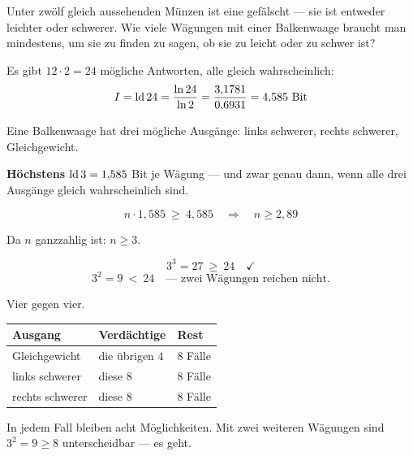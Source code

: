 \begin{aufgabe}
Unter zwölf gleich aussehenden Münzen ist eine gefälscht --- sie ist entweder leichter oder schwerer. Wie viele Wägungen mit einer Balkenwaage braucht man mindestens, um sie zu finden  zu sagen, ob sie zu leicht oder zu schwer ist?

\loesung
{}
Es gibt $12 \cdot 2 = 24$ mögliche Antworten, alle gleich wahrscheinlich:
\[ I = \operatorname{ld} 24 = \frac{\ln 24}{\ln 2} = \frac{3{,}1781}{0{,}6931} = 4{,}585 \ \text{Bit} \]

Eine Balkenwaage hat drei mögliche Ausgänge: links schwerer, rechts schwerer, Gleichgewicht.

\begin{center}
\begin{minipage}{0.9\textwidth}
\textbf{Höchstens} $\operatorname{ld} 3 = 1{,}585$ Bit je Wägung --- und zwar genau dann, wenn alle drei Ausgänge gleich wahrscheinlich sind.
\end{minipage}
\end{center}

\[ n \cdot 1{,}585 \ \ge\ 4{,}585 \quad\Longrightarrow\quad n \ge 2{,}89 \]

Da $n$ ganzzahlig ist: $n \ge 3$.

\[ 3^3 = 27 \ \ge\ 24 \quad \checkmark \]
\[ 3^2 = 9 \ < \ 24 \quad \text{--- zwei Wägungen reichen nicht.} \]

 Vier gegen vier.

\begin{center}
{\small
\renewcommand{\arraystretch}{1.5}
\begin{tabular}{@{}P{2.4cm}P{2.4cm}P{3.0cm}@{}}
\toprule
\textbf{Ausgang} & \textbf{Verdächtige} & \textbf{Rest}\\
\midrule
Gleichgewicht & die übrigen $4$ & $8$ Fälle\\
links schwerer & diese $8$ & $8$ Fälle\\
rechts schwerer & diese $8$ & $8$ Fälle\\
\bottomrule
\end{tabular}}
\end{center}

In jedem Fall bleiben acht Möglichkeiten. Mit zwei weiteren Wägungen sind $3^2 = 9 \ge 8$ unterscheidbar --- es geht.


\end{aufgabe}
